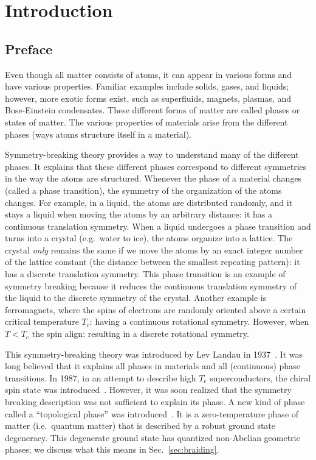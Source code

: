 \chapter{Introduction}
\label{ch:introduction}

\section{Preface}

Even though all matter consists of atoms, it can appear in various forms and have various properties.
Familiar examples include solids, gases, and liquids; however, more exotic forms exist, such as superfluids, magnets, plasmas, and Bose-Einstein condensates.
These different forms of matter are called phases or states of matter.
The various properties of materials arise from the different phases (ways atoms structure itself in a material).

Symmetry-breaking theory provides a way to understand many of the different phases.
It explains that these different phases correspond to different symmetries in the way the atoms are structured.
Whenever the phase of a material changes (called a phase transition), the symmetry of the organization of the atoms changes.
For example, in a liquid, the atoms are distributed randomly, and it stays a liquid when moving the atoms by an arbitrary distance: it has a continuous translation symmetry.
When a liquid undergoes a phase transition and turns into a crystal (e.g.~water to ice), the atoms organize into a lattice.
The crystal \textit{only} remains the same if we move the atoms by an exact integer number of the lattice constant (the distance between the smallest repeating pattern): it has a discrete translation symmetry.
This phase transition is an example of symmetry breaking because it reduces the continuous translation symmetry of the liquid to the discrete symmetry of the crystal.
Another example is ferromagnets, where the spins of electrons are randomly oriented above a certain critical temperature $T_\textrm{c}$: having a continuous rotational symmetry.
However, when $T<T_\textrm{c}$ the spin align: resulting in a discrete rotational symmetry.

This symmetry-breaking theory was introduced by Lev Landau in 1937~\cite{Landau1937}.
It was long believed that it explains all phases in materials and all (continuous) phase transitions.
In 1987, in an attempt to describe high $T_\textrm{c}$ superconductors, the chiral spin state was introduced~\cite{Kalmeyer1987}.
However, it was soon realized that the symmetry breaking description was not sufficient to explain its phase.
A new kind of phase called a ``topological phase'' was introduced~\cite{Wen1989,XiaoGang1990}.
It is a zero-temperature phase of matter (i.e.~quantum matter) that is described by a robust ground state degeneracy.
This degenerate ground state has quantized non-Abelian geometric phases; we discuss what this means in Sec.~\ref{sec:braiding}.

